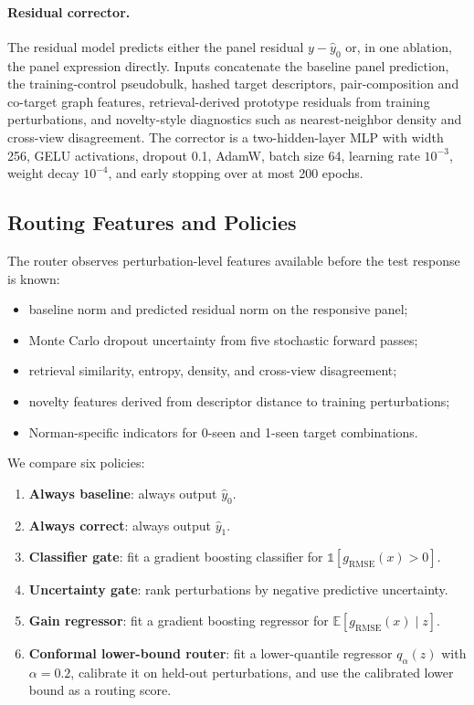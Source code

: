 \documentclass{article}
\newcommand{\yb}{\hat{y}_0}
\newcommand{\yc}{\hat{y}_1}
\newcommand{\gain}{g_{\mathrm{RMSE}}}
\begin{document}
\paragraph{Residual corrector.}
The residual model predicts either the panel residual $y-\yb$ or, in one ablation, the panel expression directly. Inputs concatenate the baseline panel prediction, the training-control pseudobulk, hashed target descriptors, pair-composition and co-target graph features, retrieval-derived prototype residuals from training perturbations, and novelty-style diagnostics such as nearest-neighbor density and cross-view disagreement. The corrector is a two-hidden-layer MLP with width 256, GELU activations, dropout 0.1, AdamW, batch size 64, learning rate $10^{-3}$, weight decay $10^{-4}$, and early stopping over at most 200 epochs.

\subsection{Routing Features and Policies}
The router observes perturbation-level features available before the test response is known:
\begin{itemize}
    \item baseline norm and predicted residual norm on the responsive panel;
    \item Monte Carlo dropout uncertainty from five stochastic forward passes;
    \item retrieval similarity, entropy, density, and cross-view disagreement;
    \item novelty features derived from descriptor distance to training perturbations;
    \item Norman-specific indicators for 0-seen and 1-seen target combinations.
\end{itemize}

We compare six policies:
\begin{enumerate}
    \item \textbf{Always baseline}: always output $\yb$.
    \item \textbf{Always correct}: always output $\yc$.
    \item \textbf{Classifier gate}: fit a gradient boosting classifier for $\mathbb{1}[\gain(x)>0]$.
    \item \textbf{Uncertainty gate}: rank perturbations by negative predictive uncertainty.
    \item \textbf{Gain regressor}: fit a gradient boosting regressor for $\mathbb{E}[\gain(x)\mid z]$.
    \item \textbf{Conformal lower-bound router}: fit a lower-quantile regressor $q_\alpha(z)$ with $\alpha=0.2$, calibrate it on held-out perturbations, and use the calibrated lower bound as a routing score.
\end{enumerate}
\end{document}

